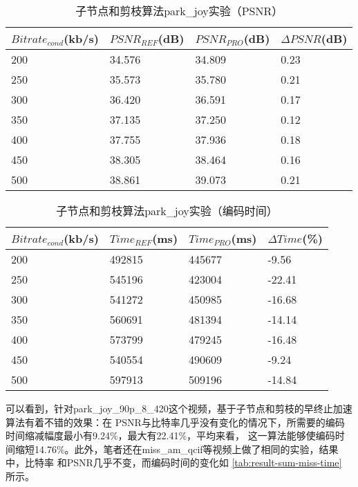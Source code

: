 \begin{table}[H]
  \centering
    \caption{子节点和剪枝算法park\_joy实验（PSNR）}
    \label{tab:result-sum-park-psnr}
    \begin{tabularx}{\linewidth}{XXXX}
      \toprule[1.5pt]
      $Bitrate_{cond}$(kb/s) & $PSNR_{REF}$(dB) & $PSNR_{PRO}$(dB) & $\Delta PSNR$(dB) \\
      \midrule[1pt]
      200 & 34.576 & 34.809 & 0.23  \\
      250 & 35.573 & 35.780 & 0.21 \\
      300 & 36.420 & 36.591 & 0.17  \\
      350 & 37.135 & 37.250 & 0.12 \\
      400 & 37.755 & 37.936 & 0.18  \\
      450 & 38.305 & 38.464 & 0.16 \\
      500 & 38.861 & 39.073 & 0.21  \\
      \bottomrule[1.5pt]
    \end{tabularx}
\end{table}

\begin{table}[H]
  \centering
    \caption{子节点和剪枝算法park\_joy实验（编码时间）}
    \label{tab:result-sum-park-time}
    \begin{tabularx}{\linewidth}{XXXX}
      \toprule[1.5pt]
      $Bitrate_{cond}$(kb/s) & $Time_{REF}$(ms) & $Time_{PRO}$(ms) & $\Delta Time$(\%) \\
      \midrule[1pt]
      200 & 492815 & 445677 & -9.56  \\
      250 & 545196 & 423004 & -22.41 \\
      300 & 541272 & 450985 & -16.68  \\
      350 & 560691 & 481394 & -14.14 \\
      400 & 573799 & 479245 & -16.48  \\
      450 & 540554 & 490609 & -9.24 \\
      500 & 597913 & 509196 & -14.84  \\
      \bottomrule[1.5pt]
    \end{tabularx}
\end{table}

可以看到，针对park\_joy\_90p\_8\_420这个视频，基于子节点和剪枝的早终止加速算法有着不错的效果：在
PSNR与比特率几乎没有变化的情况下，所需要的编码时间缩减幅度最小有9.24\%，最大有22.41\%，平均来看，
这一算法能够使编码时间缩短14.76\%。此外，笔者还在miss\_am\_qcif等视频上做了相同的实验，结果中，比特率
和PSNR几乎不变，而编码时间的变化如 \ref{tab:result-sum-miss-time} 所示。

